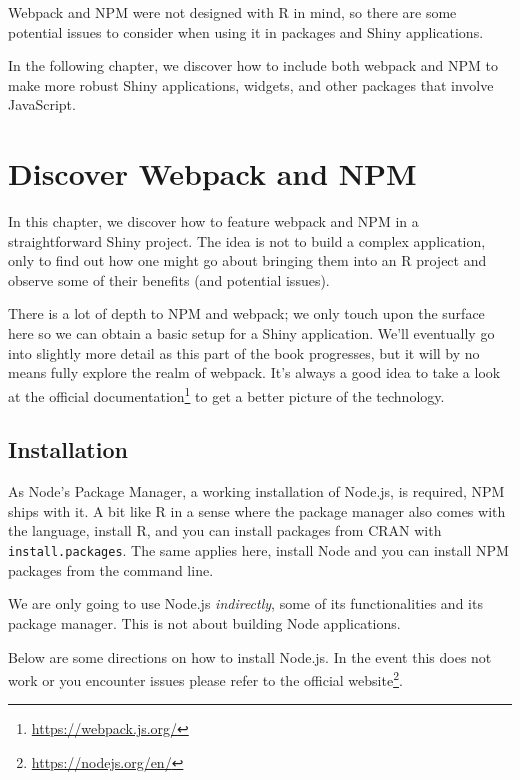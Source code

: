 \documentclass[10pt,]{krantz}
\makeatletter
\renewcommand{\href}[2]{#2\footnote{\url{#1}}}
\newenvironment{kframe}{%
\medskip{}
\setlength{\fboxsep}{.8em}
 \def\at@end@of@kframe{}%
 \ifinner\ifhmode%
  \def\at@end@of@kframe{\end{minipage}}%
  \begin{minipage}{\columnwidth}%
 \fi\fi%
 \def\FrameCommand##1{\hskip\@totalleftmargin \hskip-\fboxsep
 \colorbox{shadecolor}{##1}\hskip-\fboxsep
     \hskip-\linewidth \hskip-\@totalleftmargin \hskip\columnwidth}%
 \MakeFramed {\advance\hsize-\width
   \@totalleftmargin\z@ \linewidth\hsize
   \@setminipage}}%
 {\par\unskip\endMakeFramed%
 \at@end@of@kframe}
\newenvironment{rmdblock}[1]
  {
  \begin{itemize}
  \renewcommand{\labelitemi}{
    \raisebox{-.7\height}[0pt][0pt]{
      {\setkeys{Gin}{width=3em,keepaspectratio}\texttt{[image: images/\#1]}}
    }
  }
  \setlength{\fboxsep}{1em}
  \begin{kframe}
  \item
  }
  {
  \end{kframe}
  \end{itemize}
  }
\newenvironment{rmdnote}
  {\begin{rmdblock}{note}}
  {\end{rmdblock}}
\makeatother
\begin{document}
Webpack and NPM were not designed with R in mind, so there are some potential issues to consider when using it in packages and Shiny applications.

In the following chapter, we discover how to include both webpack and NPM to make more robust Shiny applications, widgets, and other packages that involve JavaScript.

\hypertarget{webpack-intro-discover}{%
\chapter{Discover Webpack and NPM}\label{webpack-intro-discover}}

In this chapter, we discover how to feature webpack and NPM in a straightforward Shiny project. The idea is not to build a complex application, only to find out how one might go about bringing them into an R project and observe some of their benefits (and potential issues).

There is a lot of depth to NPM and webpack; we only touch upon the surface here so we can obtain a basic setup for a Shiny application. We'll eventually go into slightly more detail as this part of the book progresses, but it will by no means fully explore the realm of webpack. It's always a good idea to take a look at the \href{https://webpack.js.org/}{official documentation} to get a better picture of the technology.

\hypertarget{webpack-intro-install}{%
\section{Installation}\label{webpack-intro-install}}

As Node's Package Manager, a working installation of Node.js, is required, NPM ships with it. A bit like R in a sense where the package manager also comes with the language, install R, and you can install packages from CRAN with \texttt{install.packages}. The same applies here, install Node and you can install NPM packages from the command line.

\begin{rmdnote}
We are only going to use Node.js \emph{indirectly}, some of its
functionalities and its package manager. This is not about building Node
applications.
\end{rmdnote}

Below are some directions on how to install Node.js. In the event this does not work or you encounter issues please refer to the \href{https://nodejs.org/en/}{official website}.
\end{document}
